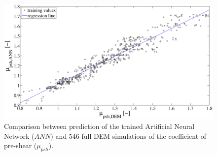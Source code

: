 \begin{figure}%
\centering 
\includegraphics[width=.96\columnwidth]{images/022regression.eps}
\caption[Comparison between prediction of the trained ANN and full DEM
simulation]{Comparison between prediction of the trained Artificial Neural
Network ($ANN$) and 546 
full DEM simulations of the coefficient of pre-shear
($\mu_{psh}$).}
\label{fig:022regression} 
\end{figure}